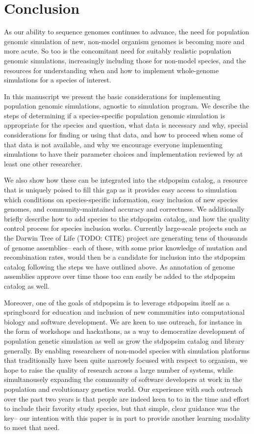 \documentclass[hidelinks]{article}
\begin{document}
\hypertarget{conclusion}{%
\section{Conclusion}\label{conclusion}}

As our ability to sequence genomes continues to advance, the need for
population genomic simulation of new, non-model organism genomes is
becoming more and more acute. So too is the concomitant need for
suitably realistic population genomic simulations, increasingly
including those for non-model species, and the resources for
understanding when and how to implement whole-genome simulations for a
species of interest.

In this manuscript we present the basic considerations for implementing
population genomic simulations, agnostic to simulation program. We
describe the steps of determining if a species-specific population
genomic simulation is appropriate for the species and question, what
data is necessary and why, special considerations for finding or using
that data, and how to proceed when some of that data is not available,
and why we encourage everyone implementing simulations to have their
parameter choices and implementation reviewed by at least one other
researcher.

We also show how these can be integrated into the stdpopsim catalog, a
resource that is uniquely poised to fill this gap as it provides easy
access to simulation which conditions on species-specific information,
easy inclusion of new species genomes, and community-maintained accuracy
and correctness. We additionally briefly describe how to add species to
the stdpopsim catalog, and how the quality control process for species
inclusion works. Currently large-scale projects such as the Darwin Tree
of Life (TODO: CITE) project are generating tens of thousands of genome
assemblies-- each of these, with some prior knowledge of mutation and
recombination rates, would then be a candidate for inclusion into the
stdpopsim catalog following the steps we have outlined above. As
annotation of genome assemblies approve over time those too can easily
be added to the stdpopsim catalog as well.

Moreover, one of the goals of stdpopsim is to leverage stdpopsim itself
as a springboard for education and inclusion of new communities into
computational biology and software development. We are keen to use
outreach, for instance in the form of workshops and hackathons, as a way
to democratize development of population genetic simulation as well as
grow the stdpopsim catalog and library generally. By enabling
researchers of non-model species with simulation platforms that
traditionally have been quite narrowly focused with respect to organism,
we hope to raise the quality of research across a large number of
systems, while simultanousely expanding the community of software
developers at work in the population and evolutionary genetics world.
Our experience with such outreach over the past two years is that people
are indeed keen to to in the time and effort to include their favority
study species, but that simple, clear guidance was the key-- our
intention with this paper is in part to provide another learning
modality to meet that need.
\end{document}
